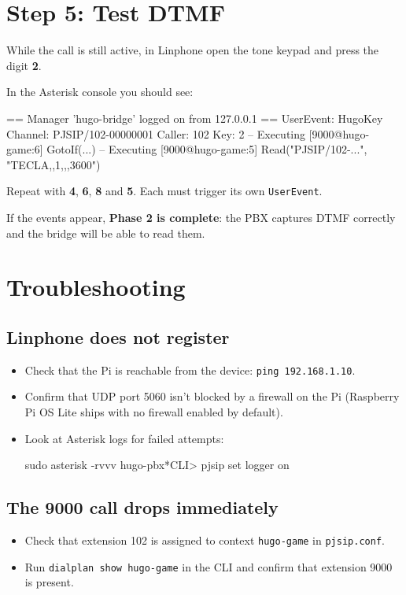 \section{Step 5: Test DTMF}

While the call is still active, in Linphone open the tone keypad and press the digit \textbf{2}.

In the Asterisk console you should see:

\begin{plaincode}
== Manager 'hugo-bridge' logged on from 127.0.0.1
== UserEvent: HugoKey
   Channel: PJSIP/102-00000001
   Caller: 102
   Key: 2
-- Executing [9000@hugo-game:6] GotoIf(...)
-- Executing [9000@hugo-game:5] Read("PJSIP/102-...", "TECLA,,1,,,3600")
\end{plaincode}

Repeat with \textbf{4}, \textbf{6}, \textbf{8} and \textbf{5}. Each must trigger its own \texttt{UserEvent}.

If the events appear, \textbf{Phase 2 is complete}: the PBX captures DTMF correctly and the bridge will be able to read them.

\section{Troubleshooting}

\subsection{Linphone does not register}

\begin{itemize}
  \item Check that the Pi is reachable from the device: \texttt{ping 192.168.1.10}.
  \item Confirm that UDP port 5060 isn't blocked by a firewall on the Pi (Raspberry Pi OS Lite ships with no firewall enabled by default).
  \item Look at Asterisk logs for failed attempts:
  \begin{shellcode}
sudo asterisk -rvvv
hugo-pbx*CLI> pjsip set logger on
  \end{shellcode}
\end{itemize}

\subsection{The 9000 call drops immediately}

\begin{itemize}
  \item Check that extension 102 is assigned to context \texttt{hugo-game} in \texttt{pjsip.conf}.
  \item Run \texttt{dialplan show hugo-game} in the CLI and confirm that extension 9000 is present.
\end{itemize}

